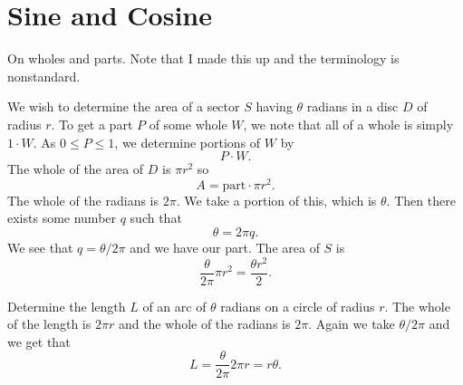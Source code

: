 \chapter*{Sine and Cosine}

On wholes and parts. Note that I made this up and the terminology is nonstandard.

We wish to determine the area of a sector $S$ having $\theta$ radians in a disc $D$ of radius $r$. To get a part $P$ of some whole $W$, we note that all of a whole is simply $1 \cdot W$. As $0 \le P \le 1$, we determine portions of $W$ by
\[P \cdot W.\]
The whole of the area of $D$ is $\pi r^2$ so
\[A = \text{part} \cdot \pi r^2.\]
The whole of the radians is $2\pi$. We take a portion of this, which is $\theta$. Then there exists some number $q$ such that
\[\theta = 2\pi q.\]
We see that $q = \theta/2\pi$ and we have our part. The area of $S$ is
\[\frac{\theta}{2\pi} \pi r^2 = \frac{\theta r^2}{2}.\]

Determine the length $L$ of an arc of $\theta$ radians on a circle of radius $r$. The whole of the length is $2\pi r$ and the whole of the radians is $2\pi$. Again we take $\theta/2\pi$ and we get that
\[L = \frac{\theta}{2\pi} 2\pi r = r\theta.\] 
